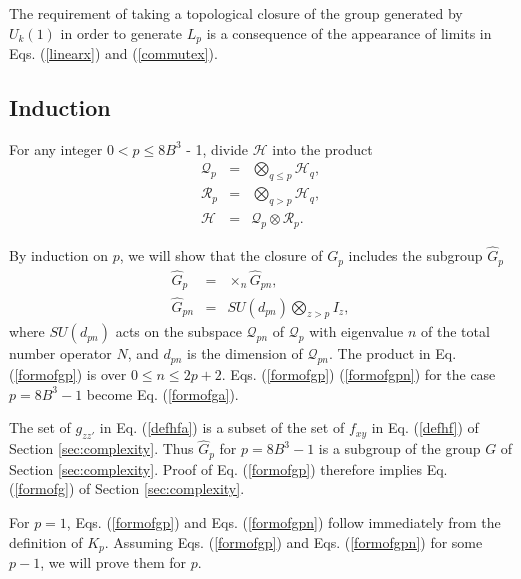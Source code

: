 \documentclass[12pt,amsmath,amssymb,onecolumn]{revtex4-2}
\begin{document}
The requirement of taking a topological closure of the
group generated by $U_k(1)$ in order to generate $L_p$
is a consequence of the appearance of limits in 
Eqs. (\ref{linearx}) and (\ref{commutex}).

\subsection{\label{app:induction} Induction}

For any integer $0 < p \le 8 B^3$ - 1,
divide $\mathcal{H}$ into the product
\begin{subequations}
\begin{eqnarray}
\label{defqa}
\mathcal{Q}_p & = & \bigotimes_{q \le p} \mathcal{H}_q, \\
\label{defra}
\mathcal{R}_p & = & \bigotimes_{q  >  p} \mathcal{H}_q, \\
\label{splita}
\mathcal{H} & = & \mathcal{Q}_p \otimes \mathcal{R}_p.
\end{eqnarray}
\end{subequations}

By induction on $p$, we will show that the closure of
$G_p$
includes the subgroup $\hat{G}_p$
\begin{subequations}
\begin{eqnarray}
\label{formofgp}
\hat{G}_p & = & \times_n \hat{G}_{p n}, \\
\label{formofgpn}
\hat{G}_{p n} & = & SU(d_{p n}) \bigotimes_{z > p} I_z,
\end{eqnarray}
\end{subequations}
where $SU(d_{p n})$ acts on the subspace $\mathcal{Q}_{p n}$ of $\mathcal{Q}_p$
with eigenvalue $n$ of the total number operator $N$, and 
$d_{p n}$ is the dimension of $\mathcal{Q}_{p n}$. 
The product in Eq. (\ref{formofgp})
is over $0 \le n \le 2 p + 2$.
Eqs. (\ref{formofgp})
(\ref{formofgpn}) for the case $p = 8B^3-1$ become Eq. (\ref{formofga}). 

The set of $g_{zz'}$ in Eq. (\ref{defhfa}) is a subset of the set of
$f_{xy}$ in Eq. (\ref{defhf}) of Section \ref{sec:complexity}.
Thus $\hat{G}_p$ for $p = 8B^3-1$ is a subgroup of the group
$G$ of Section \ref{sec:complexity}. Proof of Eq. (\ref{formofgp})
therefore implies Eq. (\ref{formofg}) of Section \ref{sec:complexity}.

For $p = 1$, Eqs. (\ref{formofgp}) and Eqs. (\ref{formofgpn})
follow immediately from the definition of $K_p$. 
Assuming Eqs. (\ref{formofgp}) and Eqs. (\ref{formofgpn}) for
some $p - 1$, we will prove them for $p$.
\end{document}
